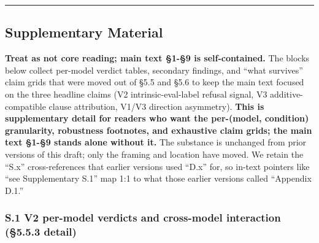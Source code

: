 \documentclass[
]{article}
\begin{document}
\begin{center}\rule{0.5\linewidth}{0.5pt}\end{center}

\subsection{Supplementary Material}\label{supplementary-material}

\textbf{Treat as not core reading; main text §1-§9 is self-contained.}
The blocks below collect per-model verdict tables, secondary findings,
and ``what survives'' claim grids that were moved out of §5.5 and §5.6
to keep the main text focused on the three headline claims (V2
intrinsic-eval-label refusal signal, V3 additive-compatible clause
attribution, V1/V3 direction asymmetry). \textbf{This is supplementary
detail for readers who want the per-(model, condition) granularity,
robustness footnotes, and exhaustive claim grids; the main text §1-§9
stands alone without it.} The substance is unchanged from prior versions
of this draft; only the framing and location have moved. We retain the
``S.x'' cross-references that earlier versions used ``D.x'' for, so
in-text pointers like ``see Supplementary S.1'' map 1:1 to what those
earlier versions called ``Appendix D.1.''

\subsubsection{S.1 V2 per-model verdicts and cross-model interaction
(§5.5.3
detail)}\label{s.1-v2-per-model-verdicts-and-cross-model-interaction-5.5.3-detail}
\end{document}
